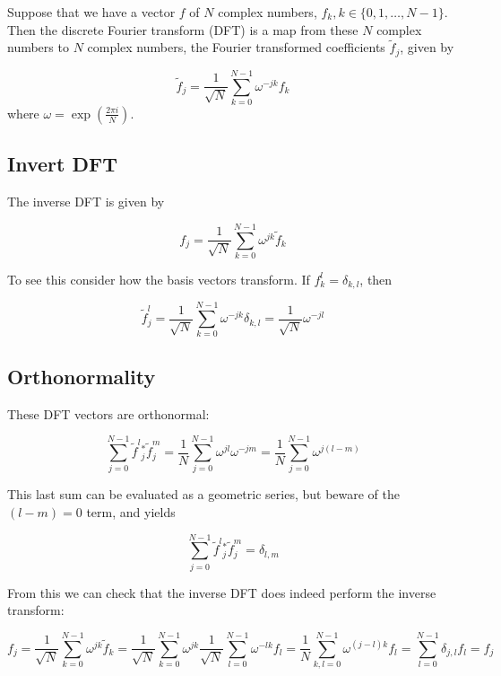 \documentclass[%
oneside,                 %
final,                   %
10pt]{article}
\begin{document}
Suppose that we have a vector $f$ of $N$ complex numbers, $f_{k}, k
\in\{0,1, \ldots, N-1\}$. Then the discrete Fourier transform (DFT) is
a map from these $N$ complex numbers to $N$ complex numbers, the
Fourier transformed coefficients $\tilde{f}_{j}$, given by

\begin{equation*}
\tilde{f}_{j}=\frac{1}{\sqrt{N}} \sum_{k=0}^{N-1} \omega^{-j k} f_{k}
\end{equation*}
where $\omega=\exp \left(\frac{2 \pi i}{N}\right)$.

\subsection{Invert DFT}
The inverse DFT is given by

\begin{equation*}
f_{j}=\frac{1}{\sqrt{N}} \sum_{k=0}^{N-1} \omega^{j k} \tilde{f}_{k}
\end{equation*}

To see this consider how the basis vectors transform. If $f_{k}^{l}=\delta_{k, l}$, then

\begin{equation*}
\tilde{f}_{j}^{l}=\frac{1}{\sqrt{N}} \sum_{k=0}^{N-1} \omega^{-j k} \delta_{k, l}=\frac{1}{\sqrt{N}} \omega^{-j l}
\end{equation*}

\subsection{Orthonormality}
These DFT vectors are orthonormal:

\begin{equation*}
\sum_{j=0}^{N-1} \tilde{f}^{l}{ }_{j}^{*} \tilde{f}_{j}^{m}=\frac{1}{N} \sum_{j=0}^{N-1} \omega^{j l} \omega^{-j m}=\frac{1}{N} \sum_{j=0}^{N-1} \omega^{j(l-m)} 
\end{equation*}

This last sum can be evaluated as a geometric series, but beware of the $(l-m)=0$ term, and yields

\begin{equation*}
\sum_{j=0}^{N-1} \tilde{f}^{l}{ }_{j}^{*} \tilde{f}_{j}^{m}=\delta_{l, m}
\end{equation*}

From this we can check that the inverse DFT does indeed perform the inverse transform:

\begin{equation*}
f_{j}=\frac{1}{\sqrt{N}} \sum_{k=0}^{N-1} \omega^{j k} \tilde{f}_{k}=\frac{1}{\sqrt{N}} \sum_{k=0}^{N-1} \omega^{j k} \frac{1}{\sqrt{N}} \sum_{l=0}^{N-1} \omega^{-l k} f_{l}=\frac{1}{N} \sum_{k, l=0}^{N-1} \omega^{(j-l) k} f_{l}=\sum_{l=0}^{N-1} \delta_{j, l} f_{l}=f_{j} 
\end{equation*}
\end{document}
